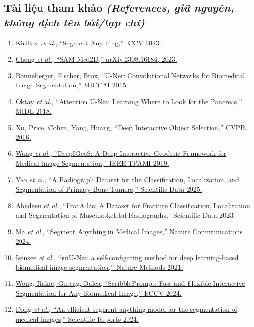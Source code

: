 \documentclass[11pt]{article}
\newcommand{\enlabel}[1]{{\small\itshape\color{gray} (#1)}}
\begin{document}
\subsection*{Tài liệu tham khảo \enlabel{References, giữ nguyên, không dịch tên bài/tạp chí}}
\begin{enumerate}[leftmargin=1.6em]
\item \href{https://arxiv.org/abs/2304.02643}{Kirillov \textit{et al.}, ``Segment Anything,'' ICCV 2023.}
\item \href{https://arxiv.org/abs/2308.16184}{Cheng \textit{et al.}, ``SAM-Med2D,'' arXiv:2308.16184, 2023.}
\item \href{https://arxiv.org/abs/1505.04597}{Ronneberger, Fischer, Brox, ``U-Net: Convolutional Networks for Biomedical Image Segmentation,'' MICCAI 2015.}
\item \href{https://arxiv.org/abs/1804.03999}{Oktay \textit{et al.}, ``Attention U-Net: Learning Where to Look for the Pancreas,'' MIDL 2018.}
\item \href{https://arxiv.org/abs/1603.04042}{Xu, Price, Cohen, Yang, Huang, ``Deep Interactive Object Selection,'' CVPR 2016.}
\item \href{https://doi.org/10.1109/TPAMI.2018.2840695}{Wang \textit{et al.}, ``DeepIGeoS: A Deep Interactive Geodesic Framework for Medical Image Segmentation,'' IEEE TPAMI 2019.}
\item \href{https://www.nature.com/articles/s41597-024-04311-y}{Yao \textit{et al.}, ``A Radiograph Dataset for the Classification, Localization, and Segmentation of Primary Bone Tumors,'' Scientific Data 2025.}
\item \href{https://www.nature.com/articles/s41597-023-02432-4}{Abedeen \textit{et al.}, ``FracAtlas: A Dataset for Fracture Classification, Localization and Segmentation of Musculoskeletal Radiographs,'' Scientific Data 2023.}
\item \href{https://www.nature.com/articles/s41467-024-44824-z}{Ma \textit{et al.}, ``Segment Anything in Medical Images,'' Nature Communications 2024.}
\item \href{https://www.nature.com/articles/s41592-020-01008-z}{Isensee \textit{et al.}, ``nnU-Net: a self-configuring method for deep learning-based biomedical image segmentation,'' Nature Methods 2021.}
\item \href{https://arxiv.org/abs/2312.07381}{Wong, Rakic, Guttag, Dalca, ``ScribblePrompt: Fast and Flexible Interactive Segmentation for Any Biomedical Image,'' ECCV 2024.}
\item \href{https://www.nature.com/articles/s41598-024-70288-8}{Dong \textit{et al.}, ``An efficient segment anything model for the segmentation of medical images,'' Scientific Reports 2024.}

\end{enumerate}
\end{document}
